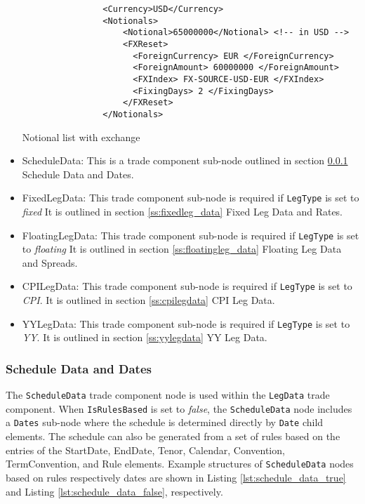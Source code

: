 \begin{itemize}
 \begin{listing}[H]
\begin{verbatim}
                <Currency>USD</Currency>
                <Notionals>
                    <Notional>65000000</Notional> <!-- in USD -->
                    <FXReset>
                      <ForeignCurrency> EUR </ForeignCurrency>
                      <ForeignAmount> 60000000 </ForeignAmount>
                      <FXIndex> FX-SOURCE-USD-EUR </FXIndex>
                      <FixingDays> 2 </FixingDays>
                    </FXReset>
                </Notionals>
\end{verbatim}
\caption{Notional list with exchange}
\label{lst:notional_fxreset}
\end{listing}


\item ScheduleData: This is a trade component sub-node outlined in section \ref{ss:schedule_data} Schedule Data and
Dates.
\item FixedLegData: This trade component sub-node is required if \lstinline!LegType! is set to \emph{fixed} It is
outlined in section \ref{ss:fixedleg_data} Fixed Leg Data and Rates.
\item FloatingLegData: This trade component sub-node is required if \lstinline!LegType! is set to \emph{floating} It is
outlined in section \ref{ss:floatingleg_data} Floating Leg Data and Spreads.
\item CPILegData: This trade component sub-node is required if \lstinline!LegType! is set to \emph{CPI}. It is
  outlined in section \ref{ss:cpilegdata} CPI Leg Data.
\item YYLegData: This trade component sub-node is required if \lstinline!LegType! is set to \emph{YY}. It is
  outlined in section \ref{ss:yylegdata} YY Leg Data.
\end{itemize}

\subsubsection{Schedule Data and Dates}\label{ss:schedule_data}

The \lstinline!ScheduleData! trade component node is used within the \lstinline!LegData! trade component. When
\lstinline!IsRulesBased! is set to \emph{false}, the \lstinline!ScheduleData! node includes a \lstinline!Dates! sub-node
where the schedule is determined directly by \lstinline!Date! child elements. The schedule can also be generated from a
set of rules based on the entries of the StartDate, EndDate, Tenor, Calendar, Convention, TermConvention, and Rule
elements.  Example structures of \lstinline!ScheduleData! nodes based on rules respectively dates are shown in Listing
\ref{lst:schedule_data_true} and Listing \ref{lst:schedule_data_false}, respectively.

